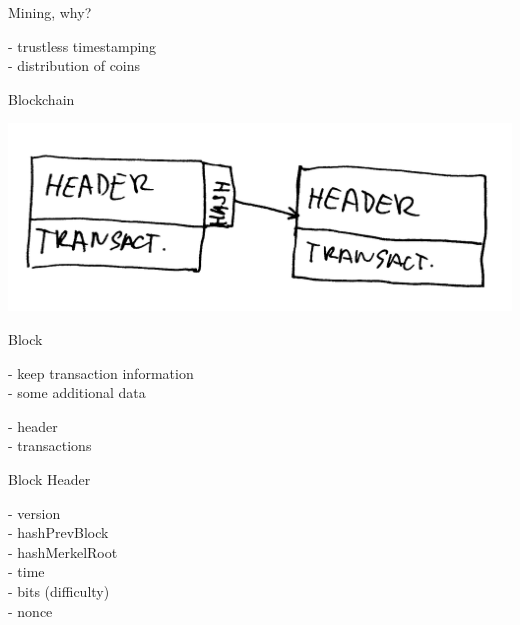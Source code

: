 \documentclass{beamer}
\begin{document}
\begin{frame}

    {\LARGE Mining, why?}\\

    \vspace{5mm}

    - trustless timestamping\\
    - distribution of coins\\

\end{frame}

\begin{frame}

    {\LARGE Blockchain}\\

    \vspace{5mm}

    \includegraphics[scale=0.185]{img/blockchain}

\end{frame}

\begin{frame}

    {\LARGE Block}\\

    \vspace{5mm}

    - keep transaction information\\
    - some additional data\\

    \vspace{5mm}

    - header\\
    - transactions\\

\end{frame}

\begin{frame}

    {\LARGE Block Header}\\

    \vspace{5mm}

    - version\\
    - hashPrevBlock\\
    - hashMerkelRoot\\
    - time\\
    - bits (difficulty)\\
    - nonce\\

\end{frame}
\end{document}
